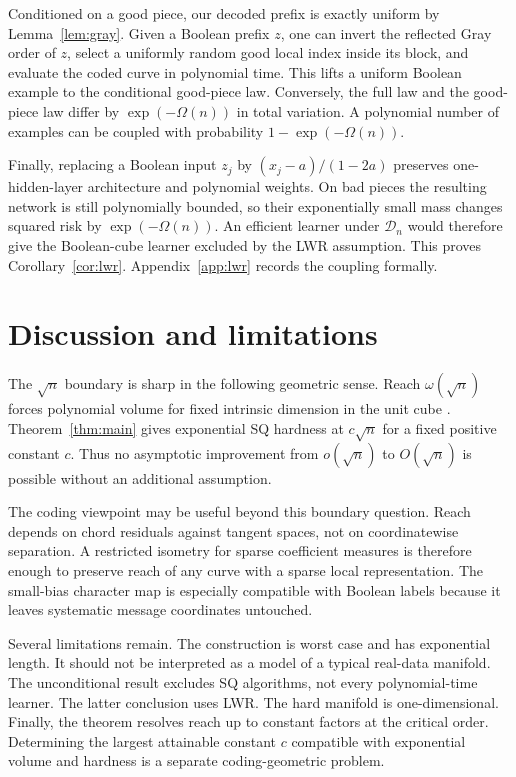 \documentclass{article}
\theoremstyle{definition}
\theoremstyle{remark}
\newcommand{\cD}{\mathcal D}
\newcommand{\1}{\mathbf 1}
\begin{document}
Conditioned on a good piece, our decoded prefix is exactly uniform by Lemma~\ref{lem:gray}. Given a Boolean prefix $z$, one can invert the reflected Gray order of $z$, select a uniformly random good local index inside its block, and evaluate the coded curve in polynomial time. This lifts a uniform Boolean example to the conditional good-piece law. Conversely, the full law and the good-piece law differ by $\exp(-\Omega(n))$ in total variation. A polynomial number of examples can be coupled with probability $1-\exp(-\Omega(n))$.

Finally, replacing a Boolean input $z_j$ by $(x_j-a)/(1-2a)$ preserves one-hidden-layer architecture and polynomial weights. On bad pieces the resulting network is still polynomially bounded, so their exponentially small mass changes squared risk by $\exp(-\Omega(n))$. An efficient learner under $\cD_n$ would therefore give the Boolean-cube learner excluded by the LWR assumption. This proves Corollary~\ref{cor:lwr}. Appendix~\ref{app:lwr} records the coupling formally.

\section{Discussion and limitations}

The $\sqrt n$ boundary is sharp in the following geometric sense. Reach $\omega(\sqrt n)$ forces polynomial volume for fixed intrinsic dimension in the unit cube \citep{kiani2024manifold}. Theorem~\ref{thm:main} gives exponential SQ hardness at $c\sqrt n$ for a fixed positive constant $c$. Thus no asymptotic improvement from $o(\sqrt n)$ to $O(\sqrt n)$ is possible without an additional assumption.

The coding viewpoint may be useful beyond this boundary question. Reach depends on chord residuals against tangent spaces, not on coordinatewise separation. A restricted isometry for sparse coefficient measures is therefore enough to preserve reach of any curve with a sparse local representation. The small-bias character map is especially compatible with Boolean labels because it leaves systematic message coordinates untouched.

Several limitations remain. The construction is worst case and has exponential length. It should not be interpreted as a model of a typical real-data manifold. The unconditional result excludes SQ algorithms, not every polynomial-time learner. The latter conclusion uses LWR. The hard manifold is one-dimensional. Finally, the theorem resolves reach up to constant factors at the critical order. Determining the largest attainable constant $c$ compatible with exponential volume and hardness is a separate coding-geometric problem.
\end{document}
